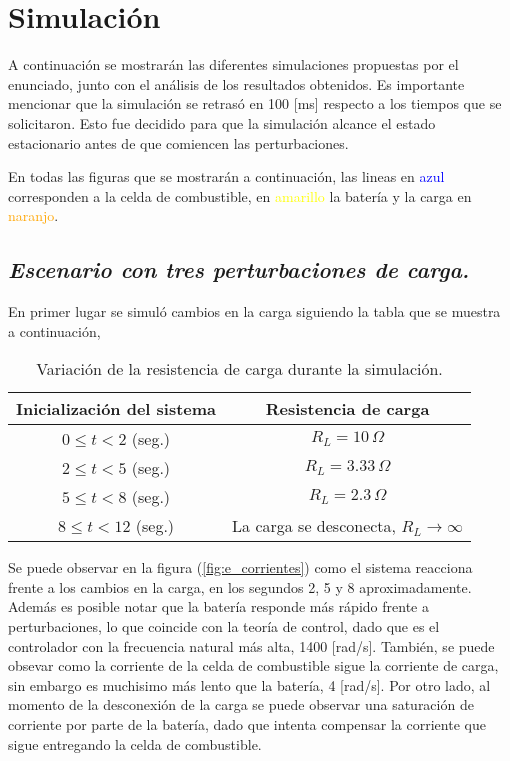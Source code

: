 \section{Simulación}
A continuación se mostrarán las diferentes simulaciones propuestas por el enunciado, junto con el análisis de los resultados obtenidos. Es importante mencionar que la simulación se retrasó en 100 [ms] respecto a los tiempos que se solicitaron. Esto fue decidido para que la simulación alcance el estado estacionario antes de que comiencen las perturbaciones.

En todas las figuras que se mostrarán a continuación, las lineas en \textcolor{blue}{azul}
corresponden a la celda de combustible, en \textcolor{yellow}{amarillo} la
batería y la carga en \textcolor{orange}{naranjo}.

\subsection{\textit{Escenario con tres perturbaciones de carga.}}

En primer lugar se simuló cambios en la carga siguiendo la tabla que se 
muestra a continuación, 

\begin{table}[H]
\centering
\begin{tabular}{|c|c|}
\hline
\textbf{Inicialización del sistema} & \textbf{Resistencia de carga} \\
\hline
$0 \leq t < 2$ (seg.) & $R_L = 10\,\Omega$ \\
\hline
$2 \leq t < 5$ (seg.) & $R_L = 3.33\,\Omega$ \\
\hline
$5 \leq t < 8$ (seg.) & $R_L = 2.3\,\Omega$ \\
\hline
$8 \leq t < 12$ (seg.) & La carga se desconecta, $R_L \rightarrow \infty$ \\
\hline
\end{tabular}
\caption{Variación de la resistencia de carga durante la simulación.}
\label{tab:e}
\end{table}

Se puede observar en la figura (\ref{fig:e_corrientes}) como el sistema reacciona
frente a los cambios en la carga, en los segundos 2, 5 y 8 aproximadamente.
Además es posible notar que la batería responde más rápido frente a perturbaciones,
lo que coincide con la teoría de control, dado que es el controlador con la
frecuencia natural más alta, 1400 [rad/s]. También, se puede obsevar como la corriente de la celda de combustible
sigue la corriente de carga, sin embargo es muchisimo más lento que la batería, 4 [rad/s]. Por otro lado,
al momento de la desconexión de la carga se puede observar una saturación de corriente por parte
de la batería, dado que intenta compensar la corriente que sigue entregando la celda de combustible.

